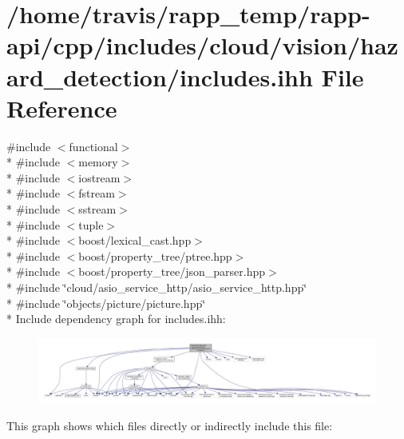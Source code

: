 \hypertarget{cloud_2vision_2hazard__detection_2includes_8ihh}{\section{/home/travis/rapp\-\_\-temp/rapp-\/api/cpp/includes/cloud/vision/hazard\-\_\-detection/includes.ihh File Reference}
\label{cloud_2vision_2hazard__detection_2includes_8ihh}
}
{\ttfamily \#include $<$functional$>$}\\*
{\ttfamily \#include $<$memory$>$}\\*
{\ttfamily \#include $<$iostream$>$}\\*
{\ttfamily \#include $<$fstream$>$}\\*
{\ttfamily \#include $<$sstream$>$}\\*
{\ttfamily \#include $<$tuple$>$}\\*
{\ttfamily \#include $<$boost/lexical\-\_\-cast.\-hpp$>$}\\*
{\ttfamily \#include $<$boost/property\-\_\-tree/ptree.\-hpp$>$}\\*
{\ttfamily \#include $<$boost/property\-\_\-tree/json\-\_\-parser.\-hpp$>$}\\*
{\ttfamily \#include \char`\"{}cloud/asio\-\_\-service\-\_\-http/asio\-\_\-service\-\_\-http.\-hpp\char`\"{}}\\*
{\ttfamily \#include \char`\"{}objects/picture/picture.\-hpp\char`\"{}}\\*
Include dependency graph for includes.\-ihh\-:
\nopagebreak
\begin{figure}[H]
\begin{center}
\leavevmode
\includegraphics[width=350pt]{cloud_2vision_2hazard__detection_2includes_8ihh__incl}
\end{center}
\end{figure}
This graph shows which files directly or indirectly include this file\-:
\nopagebreak
